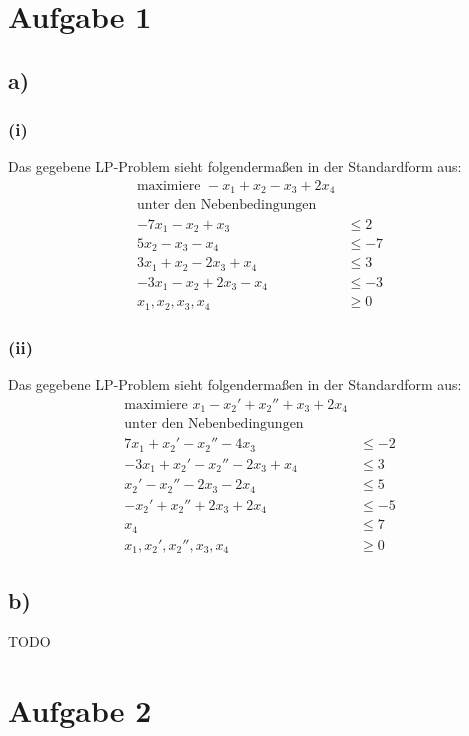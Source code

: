 \documentclass{article}
\begin{document}
\section*{Aufgabe 1}
\subsection*{a)}
\subsubsection*{(i)}

Das gegebene LP-Problem sieht folgendermaßen in der Standardform aus:
\begin{align*}
	\text{maximiere } - x_1 + x_2 - x_3 + 2x_4\\
	\text{unter den Nebenbedingungen}\\
	-7x_1 -x_2+x_3 &\leq 2\\
	5x_2-x_3-x_4 &\leq -7\\
	3x_1+x_2-2x_3+x_4 &\leq 3\\
	-3x_1-x_2+2x_3-x_4 &\leq -3\\
	x_1, x_2, x_3, x_4 &\geq 0
\end{align*}

\subsubsection*{(ii)}

Das gegebene LP-Problem sieht folgendermaßen in der Standardform aus:
\begin{align*}
	\text{maximiere } x_1 - x_2' + x_2'' + x_3 + 2x_4\\
	\text{unter den Nebenbedingungen}\\
	7x_1 + x_2' - x_2'' - 4x_3 &\leq -2\\
	-3x_1 + x_2' - x_2'' - 2x_3 + x_4 &\leq 3\\
	x_2' - x_2'' - 2x_3 - 2x_4 &\leq 5\\
	-x_2' + x_2'' + 2x_3 + 2x_4 &\leq -5\\
	x_4 &\leq 7\\
	x_1, x_2', x_2'', x_3, x_4 &\geq 0
\end{align*}

\subsection*{b)}

TODO


\section*{Aufgabe 2}
\end{document}
